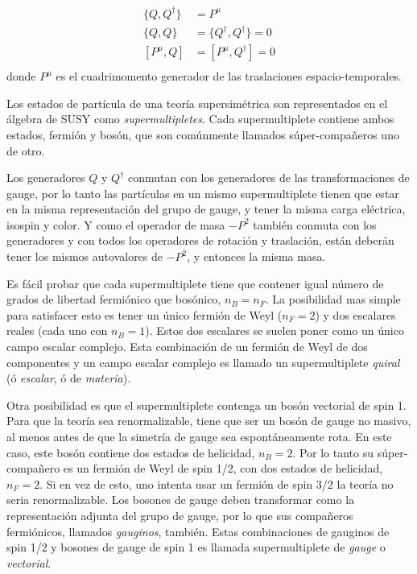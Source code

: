 \begin{align}
  \{Q, Q^\dagger\} &= P^\mu \\ \{Q, Q\} &= \{Q^\dagger, Q^\dagger\} =
  0 \\ [P^\mu, Q] &= [P^\mu, Q^\dagger] = 0 \\
\end{align}
%
donde $P^\mu$ es el cuadrimomento generador de las traslaciones
espacio-temporales.

Los estados de partícula de una teoría supersimétrica son
representados en el álgebra de SUSY como \emph{supermultipletes}. Cada
supermultiplete contiene ambos estados, fermión y bosón, que son
comúnmente llamados súper-compa\~neros uno de otro.

Los generadores $Q$ y $Q^\dagger$ conmutan con los generadores de las
transformaciones de gauge, por lo tanto las partículas en un mismo
supermultiplete tienen que estar en la misma representación del grupo
de gauge, y tener la misma carga eléctrica, isospin y color. Y como el
operador de masa $-P^2$ también conmuta con los generadores y con
todos los operadores de rotación y traslación, están deberán tener los
mismos autovalores de $-P^2$, y entonces la misma masa.

Es fácil probar que cada supermultiplete tiene que contener igual
número de grados de libertad fermiónico que bosónico, $n_B = n_F$. La
posibilidad mas simple para satisfacer esto es tener un único fermión
de Weyl ($n_F=2$) y dos escalares reales (cada uno con $n_B=1$). Estos
dos escalares se suelen poner como un único campo escalar complejo.
Esta combinación de un fermión de Weyl de dos componentes y un campo
escalar complejo es llamado un supermultiplete \emph{quiral} (ó
\emph{escalar}, ó de \emph{materia}).

Otra posibilidad es que el supermultiplete contenga un bosón vectorial
de spin 1. Para que la teoría sea renormalizable, tiene que ser un
bosón de gauge no masivo, al menos antes de que la simetría de gauge
sea espontáneamente rota. En este caso, este bosón contiene dos
estados de helicidad, $n_B=2$. Por lo tanto su súper-compa\~nero es un
fermión de Weyl de spin 1/2, con dos estados de helicidad, $n_F=2$. Si
en vez de esto, uno intenta usar un fermión de spin 3/2 la teoría no
seria renormalizable. Los bosones de gauge deben transformar como la
representación adjunta del grupo de gauge, por lo que sus compañeros
fermiónicos, llamados \emph{gauginos}, también. Estas combinaciones de
gauginos de spin 1/2 y bosones de gauge de spin 1 es llamada
supermultiplete de \emph{gauge} o \emph{vectorial}.

